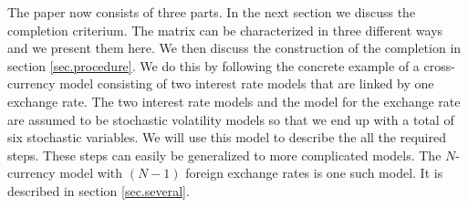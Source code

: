 \documentclass[11pt, a4paper]{article}
\begin{document}
The paper now consists of three parts. In the next section we discuss the completion criterium. The matrix can be characterized in three different ways and we present them here. We then discuss the construction of the completion in section \ref{sec.procedure}. We do this by following the concrete example of a cross-currency model consisting of two interest rate models that are linked by one exchange rate. The two interest rate models and the model for the exchange rate are assumed to be stochastic volatility models so that we end up with a total of six stochastic variables. We will use this model to describe the all the required steps. These steps can easily be generalized to more complicated models. The $N$-currency model with $(N-1)$ foreign exchange rates is one such model. It is described in section \ref{sec.several}. 
\end{document}
